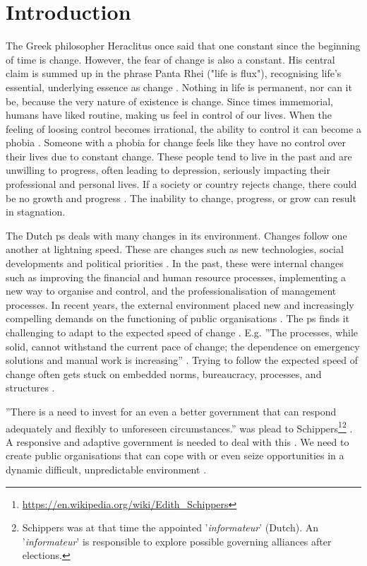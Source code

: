 \chapter{Introduction}
\label{ch:introduction}
\setcounter{footnote}{0}
The Greek philosopher Heraclitus once said that one constant since the beginning of time is change. However, the fear of change is also a constant. His central claim is summed up in the phrase Panta Rhei ("life is flux"), recognising life's essential, underlying essence as change \parencite{Seibt2022}. Nothing in life is permanent, nor can it be, because the very nature of existence is change. Since times \gls{immemorial}, humans have liked routine, making us feel in control of our lives. When the feeling of loosing control becomes irrational, the ability to control it can become a phobia \parencite{PsychTimes}. Someone with a phobia for change feels like they have no control over their lives due to constant change. These people tend to live in the past and are unwilling to progress, often leading to depression, seriously impacting their professional and personal lives. If a society or country rejects change, there could be no growth and progress \parencite{Mark2010}. The inability to change, progress, or grow can result in stagnation.

The Dutch \gls{ps} deals with many changes in its environment. Changes follow one another at lightning speed. These are changes such as new technologies, social developments and political priorities \parencite[p.~1]{Nijssen2018}. In the past, these were internal changes such as improving the financial and human resource processes, implementing a new way to organise and control, and the professionalisation of management processes. In recent years, the external environment placed new and increasingly compelling demands on the functioning of public organisations \parencite[p.~13]{Eck2009}. The \gls{ps} finds it challenging to adapt to the expected speed of change \parencites{Linders2013}[p.~2]{Wiebes2014}[pp.~5--6]{Auditdienst2019a}[p.~8]{Meijer2019}[pp.~1--2]{Tangi2020}. E.g. ''The processes, while solid, cannot withstand the current pace of change; the dependence on emergency solutions and manual work is increasing'' \parencite[p.~2]{Wiebes2014}. Trying to follow the expected speed of change often gets stuck on embedded norms, bureaucracy, processes, and structures \parencite[p.~1]{Tangi2020}. 

''There is a need to invest for an even a better government that can respond adequately and flexibly to unforeseen circumstances.'' was plead to Schippers\footnote{\url{https://en.wikipedia.org/wiki/Edith_Schippers}}\footnote{Schippers was at that time the appointed '\textit{informateur}' (Dutch). An '\textit{informateur}' is responsible to explore possible governing alliances after elections.} \parencite{Secretarissen-generaal2018}. A responsive and adaptive government is needed to deal with this \parencite[pp.~79--81]{Steen2018}. We need to create public organisations that can cope with or even seize opportunities in a dynamic difficult, unpredictable environment \parencite[pp.~1--2]{Nijssen2018}. 

